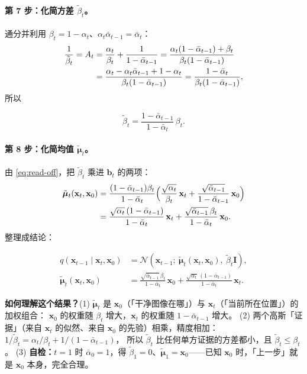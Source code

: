 \documentclass[a4paper,fontset=none,zihao=5]{ctexart}
\numberwithin{equation}{section}
\newcommand{\x}{\mathbf{x}}
\newcommand{\I}{\mathbf{I}}
\newcommand{\N}{\mathcal{N}}
\newcommand{\abar}{\bar{\alpha}}
\newcommand{\mut}{\tilde{\boldsymbol{\mu}}}
\newcommand{\btil}{\tilde{\beta}}
\begin{document}
\paragraph{第 7 步：化简方差 $\btil_t$。}通分并利用 $\beta_t=1-\alpha_t$、$\alpha_t\abar_{t-1}=\abar_t$：
\begin{align}
  \frac{1}{\btil_t}=A_t
  &= \frac{\alpha_t}{\beta_t}+\frac{1}{1-\abar_{t-1}}
   = \frac{\alpha_t(1-\abar_{t-1})+\beta_t}{\beta_t(1-\abar_{t-1})} \notag\\
  &= \frac{\alpha_t-\alpha_t\abar_{t-1}+1-\alpha_t}{\beta_t(1-\abar_{t-1})}
   = \frac{1-\abar_t}{\beta_t(1-\abar_{t-1})},
  \label{eq:precision}
\end{align}
所以
\begin{keybox}
\begin{equation}
  \btil_t=\frac{1-\abar_{t-1}}{1-\abar_t}\,\beta_t .
  \label{eq:post-var}
\end{equation}
\end{keybox}

\paragraph{第 8 步：化简均值 $\mut_t$。}由 \eqref{eq:read-off}，把 $\btil_t$ 乘进 $\mathbf{b}_t$ 的两项：
\begin{align}
  \mut_t(\x_t,\x_0)
  &= \frac{(1-\abar_{t-1})\beta_t}{1-\abar_t}\Big(\frac{\sqrt{\alpha_t}}{\beta_t}\,\x_t+\frac{\sqrt{\abar_{t-1}}}{1-\abar_{t-1}}\,\x_0\Big) \notag\\
  &= \frac{\sqrt{\alpha_t}\,(1-\abar_{t-1})}{1-\abar_t}\,\x_t+\frac{\sqrt{\abar_{t-1}}\,\beta_t}{1-\abar_t}\,\x_0 .
\end{align}
整理成结论：
\begin{keybox}
\begin{align}
  q(\x_{t-1}\mid\x_t,\x_0) &= \N\!\left(\x_{t-1};\ \mut_t(\x_t,\x_0),\ \btil_t\I\right), \label{eq:post}\\
  \mut_t(\x_t,\x_0) &= \frac{\sqrt{\abar_{t-1}}\,\beta_t}{1-\abar_t}\,\x_0
                     + \frac{\sqrt{\alpha_t}\,(1-\abar_{t-1})}{1-\abar_t}\,\x_t. \label{eq:post-mean}
\end{align}
\end{keybox}
\begin{whybox}
\textbf{如何理解这个结果？}(1) $\mut_t$ 是 $\x_0$（「干净图像在哪」）与 $\x_t$（「当前所在位置」）的加权组合：
$\x_0$ 的权重随 $\beta_t$ 增大，$\x_t$ 的权重随 $1-\abar_{t-1}$ 增大。
(2) 两个高斯「证据」（来自 $\x_t$ 的似然、来自 $\x_0$ 的先验）相乘，精度相加：$1/\btil_t=\alpha_t/\beta_t+1/(1-\abar_{t-1})$，
所以 $\btil_t$ 比任何单方证据的方差都小，且 $\btil_t\le\beta_t$。
(3) \textbf{自检：}$t=1$ 时 $\abar_0=1$，得 $\btil_1=0$、$\mut_1=\x_0$——已知 $\x_0$ 时，「上一步」就是 $\x_0$ 本身，完全合理。
\end{whybox}
\end{document}
